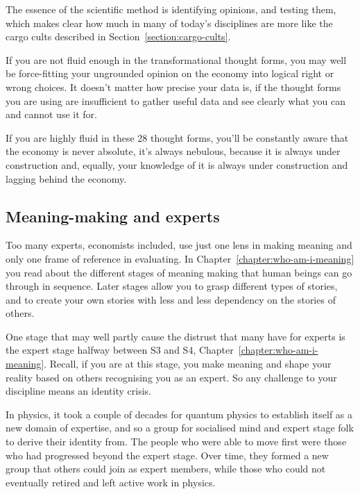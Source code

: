The essence of the scientific method is identifying opinions, and testing them, which makes clear how much in many of today's disciplines are more like the cargo cults described in Section~\ref{section:cargo-cults}.


If you are not fluid enough in the transformational thought forms, you may well be force-fitting your ungrounded opinion on the economy into logical right or wrong choices. It doesn't matter how precise your data is, if the thought forms you are using are insufficient to gather useful data and see clearly what you can and cannot use it for.


If you are highly fluid in these 28 thought forms, you'll be constantly aware that the economy is never absolute, it's always nebulous, because it is always under construction and, equally, your knowledge of it is always under construction and lagging behind the economy. 


\subsection{Meaning-making and experts}
Too many experts, economists  included, use just one lens in making meaning and only one frame of reference in evaluating. In Chapter~\ref{chapter:who-am-i-meaning} you read about the different stages of meaning making that human beings can go through in sequence. Later stages allow you to grasp different types of stories, and to create your own stories with less and less dependency on the stories of others.


One stage that may well partly cause the distrust that many have for experts is the expert stage halfway between S3 and S4, Chapter~\ref{chapter:who-am-i-meaning}. Recall, if you are at this stage, you make meaning and shape your reality based on others recognising you as an expert. So any challenge to your discipline means an identity crisis.


In physics,  it took a couple of decades for quantum physics  to establish itself as a new domain of expertise, and so a group for socialised mind and expert stage folk to derive their identity from. The people who were able to move first were those who had progressed beyond the expert stage. Over time, they formed a new group that others could join as expert members, while those who could not eventually retired and left active work in physics.


